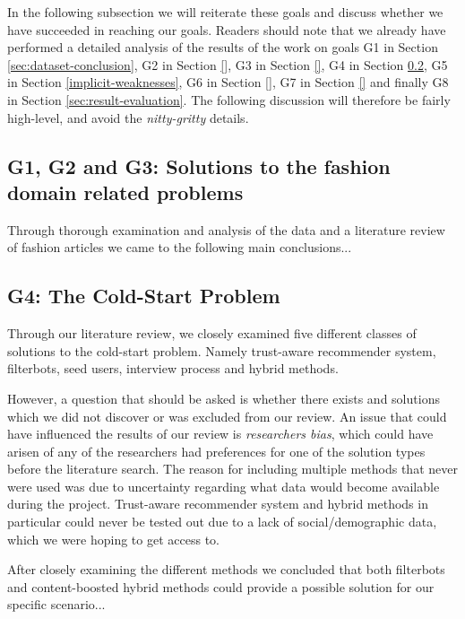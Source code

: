 In the following subsection we will reiterate these goals and discuss whether we have succeeded in reaching our goals. Readers should
note that we already have performed a detailed analysis of the results of the work on goals G1 in Section \ref{sec:dataset-conclusion},
G2 in Section \ref{}, G3 in Section \ref{}, G4 in Section \ref{sec:cold-start-discussion}, G5 in Section \ref{implicit-weaknesses},
G6 in Section \ref{}, G7 in Section \ref{} and finally G8 in Section \ref{sec:result-evaluation}.
The following discussion will therefore be fairly high-level, and avoid the \emph{nitty-gritty} details.

\subsection{G1, G2 and G3: Solutions to the fashion domain related problems}
\label{sec:fashion-discussion}

Through thorough examination and analysis of the data and a literature review of fashion articles we came to the following main conclusions...


\subsection{G4: The Cold-Start Problem}
\label{sec:cold-start-discussion}

Through our literature review, we closely examined five different classes of solutions to the cold-start problem. Namely trust-aware recommender system, filterbots, seed users, interview process and hybrid methods.

However, a question that should be asked is whether there exists and solutions which we did not discover or was excluded from our review. An issue that could have influenced the results of our review is \emph{researchers bias}, which could have arisen of any of the researchers had preferences for one of the solution types before the literature search. The reason for including multiple methods that never were used was due to uncertainty regarding what data would become available during the project. Trust-aware recommender system and hybrid methods in particular could never be tested out due to a lack of social/demographic data, which we were hoping to get access to.



After closely examining the different methods we concluded that both filterbots and content-boosted hybrid methods could provide a possible solution for
our specific scenario...

